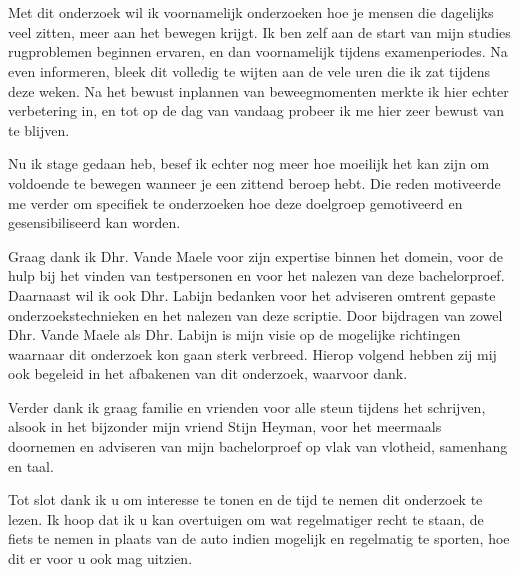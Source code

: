 
\chapter*{}%
\label{ch:voorwoord}


Met dit onderzoek wil ik voornamelijk onderzoeken hoe je mensen die dagelijks veel zitten, meer aan het bewegen krijgt. Ik ben zelf aan de start van mijn studies rugproblemen beginnen ervaren, en dan voornamelijk tijdens examenperiodes. Na even informeren, bleek dit volledig te wijten aan de vele uren die ik zat tijdens deze weken. Na het bewust inplannen van beweegmomenten merkte ik hier echter verbetering in, en tot op de dag van vandaag probeer ik me hier zeer bewust van te blijven.

Nu ik stage gedaan heb, besef ik echter nog meer hoe moeilijk het kan zijn om voldoende te bewegen wanneer je een zittend beroep hebt. Die reden motiveerde me verder om specifiek te onderzoeken hoe deze doelgroep gemotiveerd en gesensibiliseerd kan worden.

Graag dank ik Dhr. Vande Maele voor zijn expertise binnen het domein, voor de hulp bij het vinden van testpersonen en voor het nalezen van deze bachelorproef. Daarnaast wil ik ook Dhr. Labijn bedanken voor het adviseren omtrent gepaste onderzoekstechnieken en het nalezen van deze scriptie. Door bijdragen van zowel Dhr. Vande Maele als Dhr. Labijn is mijn visie op de mogelijke richtingen waarnaar dit onderzoek kon gaan sterk verbreed. Hierop volgend hebben zij mij ook begeleid in het afbakenen van dit onderzoek, waarvoor dank.

Verder dank ik graag familie en vrienden voor alle steun tijdens het schrijven, alsook in het bijzonder mijn vriend Stijn Heyman, voor het meermaals doornemen en adviseren van mijn bachelorproef op vlak van vlotheid, samenhang en taal.

Tot slot dank ik u om interesse te tonen en de tijd te nemen dit onderzoek te lezen. Ik hoop dat ik u kan overtuigen om wat regelmatiger recht te staan, de fiets te nemen in plaats van de auto indien mogelijk en regelmatig te sporten, hoe dit er voor u ook mag uitzien.